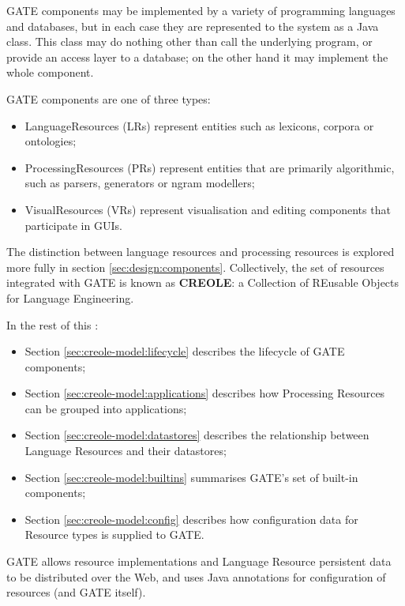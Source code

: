 GATE components may be implemented by a variety of programming languages and
databases, but in each case they are represented to the system as a Java
class. This class may do nothing other than call the underlying program, or
provide an access layer to a database; on the other hand
it may implement the whole component.

GATE components are one of three types:
%
\begin{itemize}
%
\item
LanguageResources (LRs) represent entities such as lexicons, corpora or
ontologies;
%
\item
ProcessingResources (PRs) represent entities that are primarily algorithmic,
such as parsers, generators or ngram modellers;
%
\item
VisualResources (VRs) represent visualisation and editing components that
participate in GUIs.
%
\end{itemize}
%
\ifprintedbook
\else
The distinction between language resources and processing resources is explored more fully in section \ref{sec:design:components}.
\fi
Collectively, the set of resources integrated with GATE is known as
{\bf CREOLE}: a
Collection of REusable Objects for Language Engineering.

In the rest of this \chapthing:
\begin{itemize}
\item
Section \ref{sec:creole-model:lifecycle} describes the lifecycle of GATE
components;
\item
Section \ref{sec:creole-model:applications} describes how Processing Resources
can be grouped into applications;
\item
Section \ref{sec:creole-model:datastores} describes the relationship between
Language Resources and their datastores;
\item
Section \ref{sec:creole-model:builtins} summarises GATE's set of built-in
components;
\item
Section \ref{sec:creole-model:config} describes how configuration data for
Resource types is supplied to GATE.
\end{itemize}



GATE allows resource implementations and Language Resource persistent data to
be distributed over the Web, and uses Java annotations for
configuration of resources (and GATE itself).

